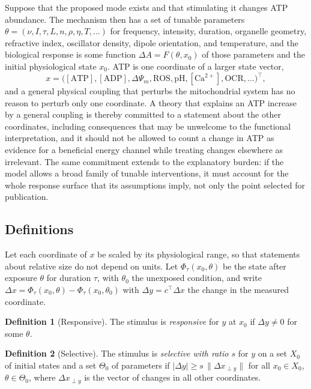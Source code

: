 \documentclass[11pt]{article}
\theoremstyle{plain}
\theoremstyle{definition}
\newtheorem{definition}{Definition}
\theoremstyle{remark}
\begin{document}
Suppose that the proposed mode exists and that stimulating it changes ATP abundance. The mechanism then has a set of tunable parameters $\theta=(\nu,I,\tau,L,n,\rho,\eta,T,\dots)$ for frequency, intensity, duration, organelle geometry, refractive index, oscillator density, dipole orientation, and temperature, and the biological response is some function $\Delta A=F(\theta,x_0)$ of those parameters and the initial physiological state $x_0$. ATP is one coordinate of a larger state vector,
\begin{equation}
x=\bigl([\mathrm{ATP}],[\mathrm{ADP}],\Delta\Psi_m,\mathrm{ROS},\mathrm{pH},[\mathrm{Ca}^{2+}],\mathrm{OCR},\dots\bigr)^{\!\top},
\end{equation}
and a general physical coupling that perturbs the mitochondrial system has no reason to perturb only one coordinate. A theory that explains an ATP increase by a general coupling is thereby committed to a statement about the other coordinates, including consequences that may be unwelcome to the functional interpretation, and it should not be allowed to count a change in ATP as evidence for a beneficial energy channel while treating changes elsewhere as irrelevant. The same commitment extends to the explanatory burden: if the model allows a broad family of tunable interventions, it must account for the whole response surface that its assumptions imply, not only the point selected for publication.

\subsection{Definitions}

Let each coordinate of $x$ be scaled by its physiological range, so that statements about relative size do not depend on units. Let $\Phi_\tau(x_0,\theta)$ be the state after exposure $\theta$ for duration $\tau$, with $\theta_0$ the unexposed condition, and write $\Delta x=\Phi_\tau(x_0,\theta)-\Phi_\tau(x_0,\theta_0)$ with $\Delta y=c^\top\Delta x$ the change in the measured coordinate.

\begin{definition}[Responsive]
The stimulus is \emph{responsive} for $y$ at $x_0$ if $\Delta y\ne0$ for some $\theta$.
\end{definition}

\begin{definition}[Selective]
The stimulus is \emph{selective with ratio $s$} for $y$ on a set $X_0$ of initial states and a set $\Theta_0$ of parameters if $|\Delta y|\ge s\,\|\Delta x_{\perp y}\|$ for all $x_0\in X_0$, $\theta\in\Theta_0$, where $\Delta x_{\perp y}$ is the vector of changes in all other coordinates.
\end{definition}
\end{document}
